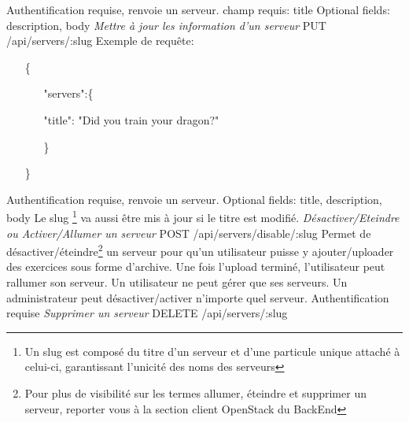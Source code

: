 \documentclass{article}
\begin{document}
Authentification requise, renvoie un serveur.
\newline
champ requis: title
\newline
Optional fields: description, body
\newline
\newline
\textit{Mettre à jour les information d'un serveur}
\newline
PUT /api/servers/:slug
\newline
Exemple de requête:
\begin{itemize}
	\item[\{]
	\begin{itemize}
		\item[]
		\item["servers":\{]
		\item[]"title": "Did you train your dragon?"
		\item[\}]
	\end{itemize}
	\item[\}]
\end{itemize}
Authentification requise, renvoie un serveur.
\newline
Optional fields: title, description, body
\newline
Le slug \footnote{\label{slug}Un slug est composé du titre d'un serveur et d'une particule unique attaché à celui-ci, garantissant l'unicité des noms des serveurs} va aussi être mis à jour si le titre est modifié.
\newline
\newline
\textit{Désactiver/Eteindre ou Activer/Allumer un serveur}
\newline
POST /api/servers/disable/:slug
\newline
Permet de désactiver/éteindre\footnote{\label{etat}Pour plus de visibilité sur les termes allumer, éteindre et supprimer un serveur, reporter vous à la section client OpenStack du BackEnd} un serveur pour qu'un utilisateur puisse y ajouter/uploader des exercices sous forme d'archive.
\newline
Une fois l'upload terminé, l'utilisateur peut rallumer son serveur.
\newline
Un utilisateur ne peut gérer que ses serveurs. Un administrateur peut désactiver/activer n'importe quel serveur.
\newline
Authentification requise
\newline
\newline
\textit{Supprimer un serveur}
\newline
DELETE /api/servers/:slug
\newline
\end{document}
